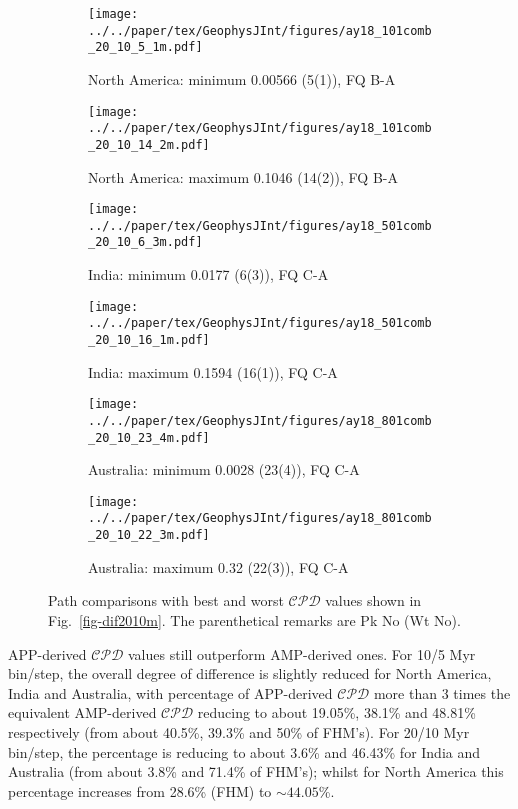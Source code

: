 \begin{figure*}
  \centering
  \begin{subfigure}{.43\textwidth}
    \texttt{[image: ../../paper/tex/GeophysJInt/figures/ay18\_101comb\_20\_10\_5\_1m.pdf]}
    \caption{North America: minimum 0.00566 (5(1)), FQ B-A}
  \end{subfigure}
  \begin{subfigure}{.43\textwidth}
    \texttt{[image: ../../paper/tex/GeophysJInt/figures/ay18\_101comb\_20\_10\_14\_2m.pdf]}
    \caption{North America: maximum 0.1046 (14(2)), FQ B-A}
  \end{subfigure}
  \vspace{.1em}
  \begin{subfigure}{.43\textwidth}
    \texttt{[image: ../../paper/tex/GeophysJInt/figures/ay18\_501comb\_20\_10\_6\_3m.pdf]}
    \caption{India: minimum 0.0177 (6(3)), FQ C-A}
  \end{subfigure}
  \begin{subfigure}{.43\textwidth}
    \texttt{[image: ../../paper/tex/GeophysJInt/figures/ay18\_501comb\_20\_10\_16\_1m.pdf]}
    \caption{India: maximum 0.1594 (16(1)), FQ C-A}
  \end{subfigure}
  \vspace{.1em}
  \begin{subfigure}{.43\textwidth}
    \texttt{[image: ../../paper/tex/GeophysJInt/figures/ay18\_801comb\_20\_10\_23\_4m.pdf]}
    \caption{Australia: minimum 0.0028 (23(4)), FQ C-A}
  \end{subfigure}
  \begin{subfigure}{.43\textwidth}
    \texttt{[image: ../../paper/tex/GeophysJInt/figures/ay18\_801comb\_20\_10\_22\_3m.pdf]}
    \caption{Australia: maximum 0.32 (22(3)), FQ C-A}
  \end{subfigure}
  \caption[Best and worst $\mathcal{CPD}$s (20/10 Myr window/step; MHM)]{Path
    comparisons with best and worst $\mathcal{CPD}$ values shown in
    Fig.~\ref{fig-dif2010m}. The parenthetical remarks are Pk No (Wt
    No).}\label{fig-dif2010bwm}
\end{figure*}

APP-derived $\mathcal{CPD}$ values still outperform AMP-derived ones. For 10/5
Myr bin/step, the overall degree of difference is slightly reduced for North
America, India and Australia, with percentage of APP-derived $\mathcal{CPD}$
more than 3 times the equivalent AMP-derived $\mathcal{CPD}$ reducing to about
19.05\%, 38.1\% and 48.81\% respectively (from about 40.5\%, 39.3\% and 50\% of
FHM's). For 20/10 Myr bin/step, the percentage is reducing to about 3.6\% and
46.43\% for India and Australia (from about 3.8\% and 71.4\% of FHM's); whilst
for North America this percentage increases from 28.6\% (FHM) to
${\sim}44.05$\%.

